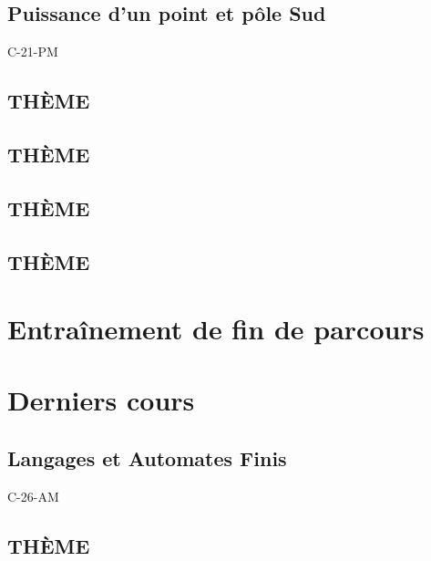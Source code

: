 \documentclass[poly,trombi]{valbonne}
\begin{document}

\subsection{Puissance d'un point et pôle Sud}

{C-21-PM}

\subsection{THÈME}


\subsection{THÈME}


\subsection{THÈME}


\subsection{THÈME}



\section{Entraînement de fin de parcours}



\section{Derniers cours}

\subsection{Langages et Automates Finis}

{C-26-AM}

\subsection{THÈME}
\end{document}
